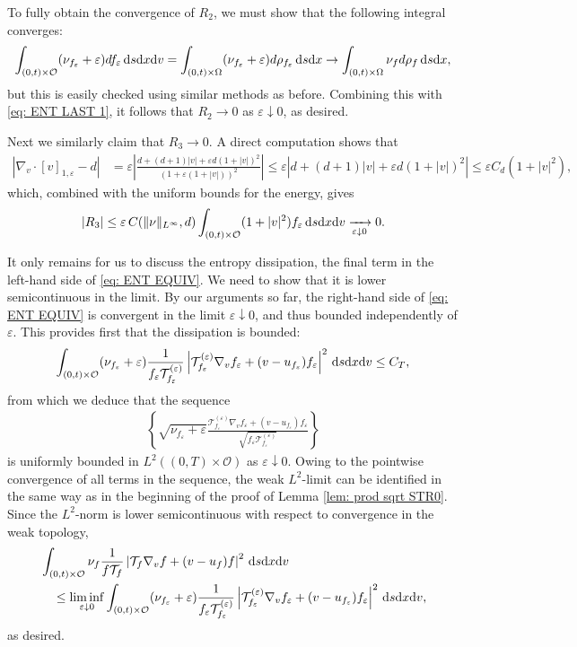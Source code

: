 \documentclass[10pt, reqno]{amsart}
\theoremstyle{plain}
\theoremstyle{definition}
\theoremstyle{remark}
\numberwithin{equation}{section}
\newcommand{\calO}{\mathcal O}
\newcommand{\calT}{\mathcal T}
\newcommand{\ve}{\varepsilon}
\newcommand{\dx}{\textnormal{d}x}
\newcommand{\dv}{\textnormal{d}v}
\newcommand{\ds}{\textnormal{d}s}
\newcommand{\lt}{\left}
\newcommand{\rt}{\right}
\newcommand{\renorm}[3]{\lt[#1\rt]_{#2 , #3}}
\begin{document}
To fully obtain the convergence of $R_2$, we must show that the following integral converges:
\begin{align*}
    \int_{(0,t)\times \calO} (\nu_{f_\ve} + \ve) df_\ve \,\ds\dx\dv = \int_{(0,t)\times \Omega} (\nu_{f_\ve} + \ve) d\rho_{f_\ve} \,\ds\dx \to \int_{(0,t)\times\Omega} \nu_f d \rho_f \,\ds\dx ,
\end{align*}
but this is easily checked using similar methods as before. Combining this with \eqref{eq: ENT LAST 1}, it follows that $R_2 \to 0$ as $\ve\downarrow 0$, as desired.

Next we similarly claim that $R_3\to 0$. A direct computation shows that
\begin{align*}
    \lt|\nabla_v\cdot \renorm{v}{1}{\ve} - d\rt| &= \ve \lt|\frac{d + (d+1)|v| + \ve d (1 + |v|)^2}{(1 + \ve (1+|v|))^2} \rt| \le \ve \lt| d + (d+1)|v| + \ve d (1 + |v|)^2 \rt|  \le \ve C_d (1+|v|^2),
\end{align*}
which, combined with the uniform bounds for the energy, gives
\begin{align*}
    |R_3| \le \ve \, C(\|\nu\|_{L^\infty},d) \int_{(0,t)\times \calO} (1+|v|^2) f_\ve \,\ds\dx\dv \xrightarrow[\ve\downarrow 0]{} 0.
\end{align*}

It only remains for us to discuss the entropy dissipation, the final term in the left-hand side of \eqref{eq: ENT EQUIV}. We need to show that it is lower semicontinuous in the limit. By our arguments so far, the right-hand side of \eqref{eq: ENT EQUIV} is convergent in the limit $\ve\downarrow 0$, and thus bounded independently of $\ve$. This provides first that the dissipation is bounded:
\begin{align*}
    \int_{(0,t)\times \calO} (\nu_{f_\ve} + \ve) \frac{1}{f_\ve \calT_{f_\ve}^{(\ve)}} \lt| \calT_{f_\ve}^{(\ve)} \nabla_v f_\ve + (v-u_{f_\ve}) f_\ve \rt|^2 \,\ds\dx\dv \le C_T,
\end{align*}
from which we deduce that the sequence
\begin{align*}
    \lt\{\sqrt{\nu_{f_\ve} + \ve} \frac{\calT_{f_\ve}^{(\ve)}\nabla_v f_\ve + (v-u_{f_\ve}) f_\ve}{\sqrt{f_\ve \calT_{f_\ve}^{(\ve)}}} \rt\}
\end{align*}
is uniformly bounded in $L^2((0,T)\times \calO)$ as $\ve\downarrow 0$. Owing to the pointwise convergence of all terms in the sequence, the weak $L^2$-limit can be identified in the same way as in the beginning of the proof of Lemma \ref{lem: prod sqrt STR0}. Since the $L^2$-norm is lower semicontinuous with respect to convergence in the weak topology,
\begin{align*}
    &\int_{(0,t)\times \calO} \nu_f \frac{1}{f \calT_f} \lt| \calT_f \nabla_v f + (v-u_f) f \rt|^2 \,\ds\dx\dv \\
    &\quad \le \liminf_{\ve\downarrow 0} \int_{(0,t)\times \calO} (\nu_{f_\ve} + \ve) \frac{1}{f_\ve \calT_{f_\ve}^{(\ve)}} \lt| \calT_{f_\ve}^{(\ve)} \nabla_v f_\ve + (v-u_{f_\ve}) f_\ve \rt|^2 \,\ds\dx\dv,
\end{align*}
as desired.
\end{document}

